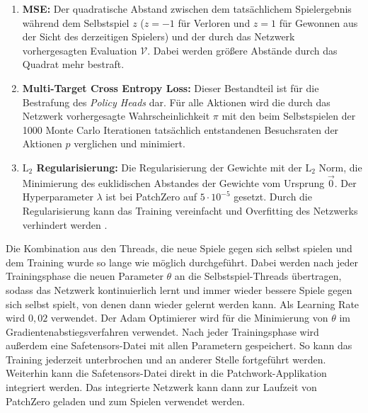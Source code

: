 \begin{enumerate}
    \item \vspace*{-0.1cm} \textbf{\acf{MSE}:} Der quadratische Abstand zwischen dem tatsächlichem Spielergebnis während dem Selbstspiel $z$ ($z=-1$ für Verloren und $z=1$ für Gewonnen aus der Sicht des derzeitigen Spielers) und der durch das Netzwerk vorhergesagten Evaluation $\mathcal{V}$. Dabei werden größere Abstände durch das Quadrat mehr bestraft.
    \item \vspace*{-0.1cm} \textbf{Multi-Target Cross Entropy Loss:} Dieser Bestandteil ist für die Bestrafung des \emph{Policy Heads} dar. Für alle Aktionen wird die durch das Netzwerk vorhergesagte Wahrscheinlichkeit $\pi$ mit den beim Selbstspielen der 1000 Monte Carlo Iterationen tatsächlich entstandenen Besuchsraten der Aktionen $p$ verglichen und minimiert.
    \item \vspace*{-0.1cm} \textbf{$\text{L}_2$ Regularisierung:} Die Regularisierung der Gewichte mit der $\text{L}_2$ Norm, \dash die Minimierung des euklidischen Abstandes der Gewichte vom Ursprung $\vec{0}$. Der Hyperparameter $\lambda$ ist bei PatchZero auf $5\cdot 10^{-5}$ gesetzt. Durch die Regularisierung kann das Training vereinfacht und Overfitting des Netzwerks verhindert werden \cite{2017.Regularization}.
\end{enumerate}
\vspace*{-0.1cm}

Die Kombination aus den Threads, die neue Spiele gegen sich selbst spielen und dem Training wurde so lange wie möglich durchgeführt. Dabei werden nach jeder Trainingsphase die neuen Parameter $\theta$ an die Selbstspiel-Threads übertragen, sodass das Netzwerk kontinuierlich lernt und immer wieder bessere Spiele gegen sich selbst spielt, von denen dann wieder gelernt werden kann. Als Learning Rate wird $0{,}02$ verwendet. Der Adam Optimierer \cite{2014.Adam} wird für die Minimierung von $\theta$ im Gradientenabstiegsverfahren verwendet. Nach jeder Trainingsphase wird außerdem eine Safetensors-Datei \cite{2024.Safetensors} mit allen Parametern gespeichert. So kann das Training jederzeit unterbrochen und an anderer Stelle fortgeführt werden. Weiterhin kann die Safetensors-Datei direkt in die Patchwork-Applikation integriert werden. Das integrierte Netzwerk kann dann zur Laufzeit von PatchZero geladen und zum Spielen verwendet werden.

\vspace*{-5cm}
\pagebreak